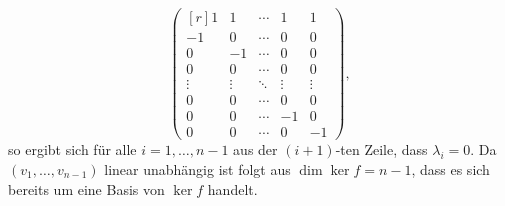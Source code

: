 \begin{solution}
\[\begin{pmatrix*}[r]
    1     &  1     & \cdots &  1     &  1     \\
   -1     &  0     & \cdots &  0     &  0     \\
    0     & -1     & \cdots &  0     &  0     \\
    0     &  0     & \cdots &  0     &  0     \\
   \vdots & \vdots & \ddots & \vdots & \vdots \\
    0     &  0     & \cdots &  0     &  0     \\
    0     &  0     & \cdots & -1     &  0     \\
    0     &  0     & \cdots &  0     & -1
  \end{pmatrix*},
 \]
 so ergibt sich für alle $i=1, \dotsc, n-1$ aus der $(i+1)$-ten Zeile, dass $\lambda_i = 0$. Da $(v_1, \dotsc, v_{n-1})$ linear unabhängig ist folgt aus $\dim \ker f = n-1$, dass es sich bereits um eine Basis von $\ker f$ handelt.
\end{solution}


